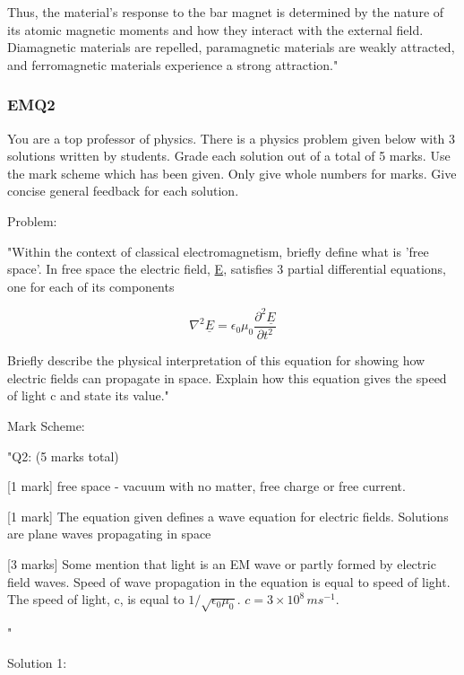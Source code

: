 Thus, the material's response to the bar magnet is determined by the nature of its atomic magnetic moments and how they interact with the external field. Diamagnetic materials are repelled, paramagnetic materials are weakly attracted, and ferromagnetic materials experience a strong attraction."

\subsubsection{EMQ2}

You are a top professor of physics. There is a physics problem given below with 3 solutions written by students. Grade each solution out of a total of 5 marks. Use the mark scheme which has been given. Only give whole numbers for marks. Give concise general feedback for each solution. 

Problem: 

"Within the context of classical electromagnetism, briefly define what is 'free space'. In free space the electric field, \underline{E}, satisfies 3 partial differential equations, one for each of its components

\[
\nabla^{2}\underline{E} =  \epsilon_{0}\mu_{0}\frac{\partial^2 \underline{E}}{\partial t^{2}}
\]

Briefly describe the physical interpretation of this equation for showing how electric fields can propagate in space. Explain how this equation gives the speed of light c and state its value." 

Mark Scheme:

"{Q2: (5 marks total)}

[1 mark] free space - vacuum with no matter, free charge or free current.

[1 mark] The equation given defines a wave equation for electric fields. Solutions are plane waves propagating in space

[3 marks] Some mention that light is an EM wave or partly formed by electric field waves. Speed of wave propagation in the equation is equal to speed of light. The speed of light, c,  is equal to \(1/\sqrt{\epsilon_{0}\mu_{0}}\). \(c = 3 \times 10^8 \, ms^{-1}\).

"

Solution 1: 

